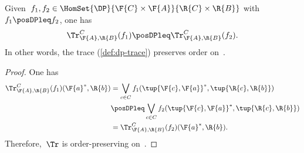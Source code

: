 \begin{lemma}
  Given~$f_1,f_2\in \HomSet{\DP}{\F{C}\times \F{A}}{\R{C}\times \R{B}}$ with~$f_1\posDPleq f_2$, one has
  \begin{equation}
    \Tr_{\F{A},\R{B}}^C(f_1)\posDPleq \Tr_{\F{A},\R{B}}^C(f_2).
  \end{equation}
  In other words, the trace (\cref{def:dp-trace}) preserves order on~\DP.
\end{lemma}

\begin{proof}
  One has
  \begin{equation}
    \begin{aligned}
      \Tr_{\F{A},\R{B}}^C(f_1)(\F{a}^*,\R{b})&=\bigvee_{c\in C}f_1(\tup{\F{c},\F{a}}^*,\tup{\R{c},\R{b}})\\
      &\posDPleq \bigvee_{c\in C}f_2(\tup{\F{c},\F{a}}^*,\tup{\R{c},\R{b}})\\
      &=\Tr_{\F{A},\R{B}}^C(f_2)(\F{a}^*,\R{b}).
    \end{aligned}
  \end{equation}
  Therefore,~$\Tr$ is order-preserving on~\DP.
\end{proof}
